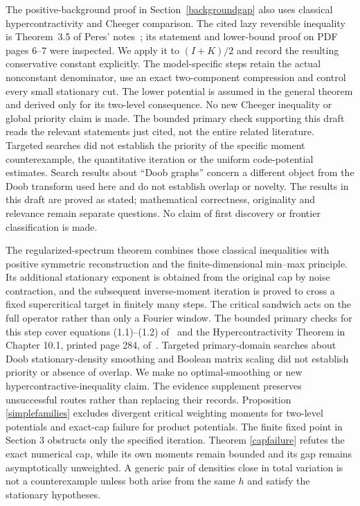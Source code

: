 \documentclass[11pt]{article}
\begin{document}
The positive-background proof in Section~\ref{backgroundgap} also uses classical hypercontractivity and Cheeger comparison. The cited lazy reversible inequality is Theorem~3.5 of Peres' notes~\cite{peres}; its statement and lower-bound proof on PDF pages 6--7 were inspected. We apply it to $(I+K)/2$ and record the resulting conservative constant explicitly. The model-specific steps retain the actual nonconstant denominator, use an exact two-component compression and control every small stationary cut. The lower potential is assumed in the general theorem and derived only for its two-level consequence. No new Cheeger inequality or global priority claim is made. The bounded primary check supporting this draft reads the relevant statements just cited, not the entire related literature. Targeted searches did not establish the priority of the specific moment counterexample, the quantitative iteration or the uniform code-potential estimates. Search results about ``Doob graphs'' concern a different object from the Doob transform used here and do not establish overlap or novelty. The results in this draft are proved as stated; mathematical correctness, originality and relevance remain separate questions. No claim of first discovery or frontier classification is made.

The regularized-spectrum theorem combines those classical inequalities with
positive symmetric reconstruction and the finite-dimensional min--max
principle. Its additional stationary exponent is obtained from the original
cap by noise contraction, and the subsequent inverse-moment iteration is
proved to cross a fixed supercritical target in finitely many steps.
The critical sandwich acts on the full operator rather than only a Fourier
window. The bounded primary checks for this step cover equations (1.1)--(1.2)
of~\cite{mos} and the Hypercontractivity Theorem in Chapter 10.1, printed
page 284, of~\cite{odonnell}. Targeted primary-domain searches about Doob
stationary-density smoothing and Boolean matrix scaling did not establish
priority or absence of overlap. We make no optimal-smoothing or new
hypercontractive-inequality claim.
The evidence supplement preserves unsuccessful routes rather than replacing their records. Proposition \ref{simplefamilies} excludes divergent critical weighting moments for two-level potentials and exact-cap failure for product potentials. The finite fixed point in Section 3 obstructs only the specified iteration. Theorem \ref{capfailure} refutes the exact numerical cap, while its own moments remain bounded and its gap remains asymptotically unweighted. A generic pair of densities close in total variation is not a counterexample unless both arise from the same $h$ and satisfy the stationary hypotheses.
\end{document}
